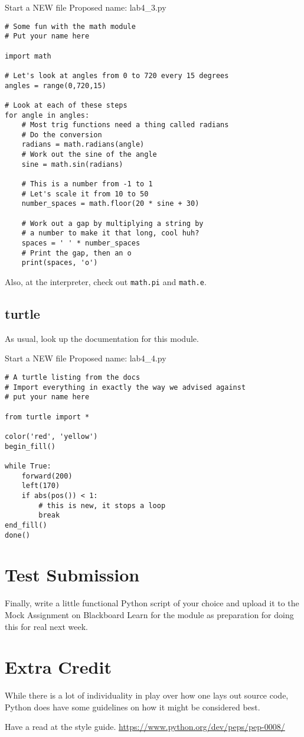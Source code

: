 \documentclass[12pt,oneside]{cttutorial}
\begin{document}
\alert{Start a NEW file}
Proposed name: lab4\_3.py
\begin{lstlisting}
# Some fun with the math module
# Put your name here

import math

# Let's look at angles from 0 to 720 every 15 degrees
angles = range(0,720,15)

# Look at each of these steps
for angle in angles:
    # Most trig functions need a thing called radians
    # Do the conversion
    radians = math.radians(angle)
    # Work out the sine of the angle
    sine = math.sin(radians)

    # This is a number from -1 to 1
    # Let's scale it from 10 to 50
    number_spaces = math.floor(20 * sine + 30)

    # Work out a gap by multiplying a string by
    # a number to make it that long, cool huh?
    spaces = ' ' * number_spaces
    # Print the gap, then an o
    print(spaces, 'o')
\end{lstlisting}

Also, at the interpreter, check out \lstinline!math.pi! and \lstinline!math.e!.

\subsection{turtle}

As usual, look up the documentation for this module.

\alert{Start a NEW file}
Proposed name: lab4\_4.py
\begin{lstlisting}
# A turtle listing from the docs
# Import everything in exactly the way we advised against
# put your name here

from turtle import *

color('red', 'yellow')
begin_fill()

while True:
    forward(200)
    left(170)
    if abs(pos()) < 1:
        # this is new, it stops a loop
        break
end_fill()
done()
\end{lstlisting}

\section{Test Submission}

Finally, write a little functional Python script of your choice and upload it to the Mock Assignment on Blackboard Learn for the module as preparation for doing this for real next week.

\section{Extra Credit}

While there is a lot of individuality in play over how one lays out source code, Python does have some guidelines on how it might be considered best.

Have a read at the style guide. \url{https://www.python.org/dev/peps/pep-0008/}
\end{document}
